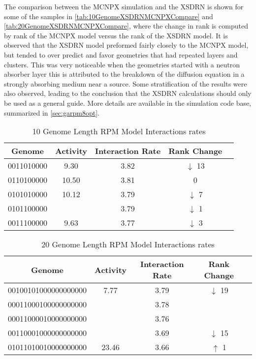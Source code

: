 The comparison between the MCNPX simulation and the XSDRN is shown for some of the samples in \autoref{tab:10GenomeXSDRNMCNPXCompare} and \autoref{tab:20GenomeXSDRNMCNPXCompare}, where the change in rank is computed by rank of the MCNPX model versus the rank of the XSDRN model.
It is observed that the XSDRN model preformed fairly closely to the MCNPX model, but tended to over predict and favor geometries that had repeated layers and clusters.
This was very noticeable when the geometries started with a neutron absorber layer this is attributed to the breakdown of the diffusion equation in a strongly absorbing medium near a source.
Some stratification of the results were also observed, leading to the conclusion that the XSDRN calculations should only be used as a general guide.
More details are available in the simulation code base, summarized in \autoref{sec:garpm8opt}.
\begin{table}
  \caption[10 Genome Length RPM Model]{10 Genome Length RPM Model Interactions rates}
  \label{tab:10GenomeXSDRNMCNPXCompare}
  \begin{tabular}{c c | c c | c}
    \toprule
    Genome & Activity & Interaction Rate & Rank Change \\
    \midrule
  0011010000& 9.30 &  3.82 & $\downarrow$ 13 \\
  0110100000 & 10.50  &  3.81 & 0 \\
  0101010000 & 10.12  & 3.79 & $\downarrow$ 7 \\
 0101100000 &  & 3.79 & $\downarrow$ 1\\
  0011100000 & 9.63 &  3.77 & $\downarrow$ 3 \\
    \bottomrule
  \end{tabular}
\end{table}
\begin{table}
  \caption[20 Genome Length RPM Model]{20 Genome Length RPM Model Interactions rates}
  \label{tab:20GenomeXSDRNMCNPXCompare}
  \begin{tabular}{c c | c c | c}
    \toprule
    Genome & Activity  & Interaction Rate & Rank Change \\
    \midrule
  00100101000000000000 & 7.77 & 3.79 & $\downarrow$ 19 \\
  00011000100000000000 &  & 3.78 &  \\
  00011000010000000000 &  &  3.76 &  \\
  00110001000000000000 &  &  3.69 & $\downarrow$ 15\\
  01011010010000000000 & 23.46 & 3.66 & $\uparrow$ 1\\
    \bottomrule
  \end{tabular}
\end{table}

